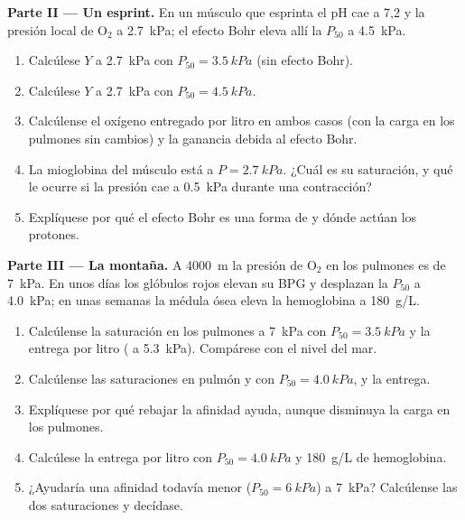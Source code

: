\begin{problem}
\medskip
\noindent\textbf{Parte II --- Un esprint.}
En un músculo que esprinta el pH cae a 7,2 y la presión local de
$\mathrm{O_2}$ a \qty{2.7}{kPa}; el efecto Bohr eleva allí la $P_{50}$ a
\qty{4.5}{kPa}.
\begin{enumerate}[resume]
  \item Calcúlese $Y$ a \qty{2.7}{kPa} con $P_{50} = \qty{3.5}{kPa}$ (sin
        efecto Bohr).
  \item Calcúlese $Y$ a \qty{2.7}{kPa} con $P_{50} = \qty{4.5}{kPa}$.
  \item Calcúlense el oxígeno entregado por litro en ambos casos (con la
        carga en los pulmones sin cambios) y la ganancia debida al efecto
        Bohr.
  \item La mioglobina del músculo está a $P = \qty{2.7}{kPa}$. ¿Cuál es su
        saturación, y qué le ocurre si la presión cae a \qty{0.5}{kPa}
        durante una contracción?
  \item Explíquese por qué el efecto Bohr es una forma de  y
        dónde actúan los protones.
\end{enumerate}

\medskip
\noindent\textbf{Parte III --- La montaña.}
A \qty{4000}{m} la presión de $\mathrm{O_2}$ en los pulmones es de
\qty{7}{kPa}. En unos días los glóbulos rojos elevan su BPG y desplazan la
$P_{50}$ a \qty{4.0}{kPa}; en unas semanas la médula ósea eleva la
hemoglobina a \qty{180}{g/L}.
\begin{enumerate}[resume]
  \item Calcúlense la saturación en los pulmones a \qty{7}{kPa} con
        $P_{50} = \qty{3.5}{kPa}$ y la entrega por litro ( a
        \qty{5.3}{kPa}). Compárese con el nivel del mar.
  \item Calcúlense las saturaciones en pulmón y  con
        $P_{50} = \qty{4.0}{kPa}$, y la entrega.
  \item Explíquese por qué rebajar la afinidad ayuda, aunque disminuya la
        carga en los pulmones.
  \item Calcúlese la entrega por litro con $P_{50} = \qty{4.0}{kPa}$ y
        \qty{180}{g/L} de hemoglobina.
  \item ¿Ayudaría una afinidad todavía menor ($P_{50} = \qty{6}{kPa}$) a
        \qty{7}{kPa}? Calcúlense las dos saturaciones y decídase.
\end{enumerate}


\end{problem}
